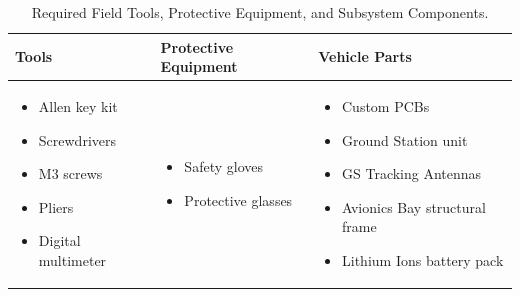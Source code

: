 \documentclass[11pt,a4paper]{article}
\begin{document}
\begin{table}[H]
    \centering
    \small
    \caption{Required Field Tools, Protective Equipment, and Subsystem Components.}
    \label{tab:checklist_tools}
    \vspace{0.2cm}
    \begin{tabularx}{\textwidth}{|X|X|X|}
        \hline
        \rowcolor{EtseNavy}
        \textbf{\color{white}Tools} & \textbf{\color{white}Protective Equipment} & \textbf{\color{white}Vehicle Parts} \\ \hline
        \begin{itemize}
            \item Allen key kit
            \item Screwdrivers
            \item M3 screws
            \item Pliers
            \item Digital multimeter
        \end{itemize} & 
        \begin{itemize}
            \item Safety gloves
            \item Protective glasses
        \end{itemize} & 
        \begin{itemize}
            \item Custom PCBs
            \item Ground Station unit
            \item GS Tracking Antennas
            \item Avionics Bay structural frame
            \item Lithium Ions battery pack
        \end{itemize} \\ \hline
    \end{tabularx}
\end{table}
\end{document}
